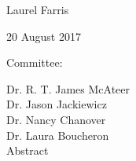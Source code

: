 \documentclass[modern]{aastex62}
\begin{document}
\begin{titlepage}\centering



    {\scshape\LARGE\par}
    \vfill
    {\Large Laurel Farris\par}
    \vfill
    {\large 20 August 2017\par}
    \vfill
    {\large Committee:}

    Dr. R. T. James McAteer\\
    Dr. Jason Jackiewicz\\
    Dr. Nancy Chanover\\
    Dr. Laura Boucheron\\
    \vfill
    {\large Abstract}
    \justify

    

    \centering
\end{titlepage}

\newpage
\setlength{\parskip}{0.5ex}
\tableofcontents



\newpage
\setlength{\parskip}{2.00ex}

\setlength{\marginparwidth}{1.50in}
\setlength{\marginparsep}{0.30in}


%





\end{document}

